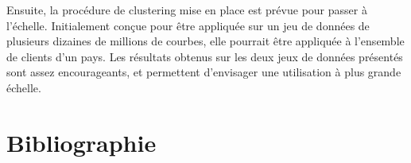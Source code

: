 \documentclass[12pt]{article}
\begin{document}
Ensuite, la procédure de clustering mise en place est prévue pour passer à l'échelle. Initialement conçue pour être appliquée sur un jeu de données de plusieurs dizaines de millions de courbes, elle pourrait être appliquée à l'ensemble de clients d'un pays. Les résultats obtenus sur les deux jeux de données présentés sont assez encourageants, et permettent d'envisager une utilisation à plus grande échelle.




\section*{Bibliographie}
\end{document}
